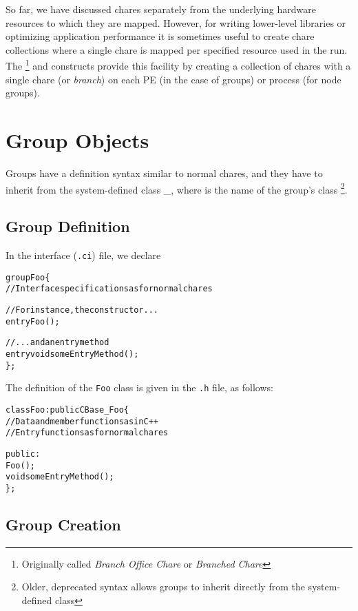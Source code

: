 So far, we have discussed chares separately from the underlying
hardware resources to which they are mapped. However, for writing
lower-level libraries or optimizing application performance it is
sometimes useful to create chare collections where a single chare is
mapped per specified resource used in the run. The
 \footnote{Originally called {\em Branch Office Chare} or
  {\em Branched Chare}} and  constructs provide this
facility by creating a collection of chares with a single
chare (or {\sl branch}) on each PE (in the case of groups) or process
(for node groups). 

\section{Group Objects}
\label{sec:group}

Groups have a definition syntax similar to normal chares, and they
have to inherit from the system-defined class
\_, where  is the name of the
group's \CC{} class \footnote{Older, deprecated syntax allows groups
to inherit directly from the system-defined class }.

\subsection{Group Definition}

In the interface ({\tt .ci}) file, we declare

\begin{alltt}
group Foo \{
  // Interface specifications as for normal chares

  // For instance, the constructor ...
  entry Foo();

  // ... and an entry method
  entry void someEntryMethod();
\};
\end{alltt}

The definition of the {\tt Foo} class is given in the \texttt{.h} file, as follows:

\begin{alltt}
class Foo : public CBase\_Foo \{
  // Data and member functions as in C++
  // Entry functions as for normal chares

  public:
    Foo();
    void someEntryMethod();
\};
\end{alltt}

\subsection{Group Creation}

